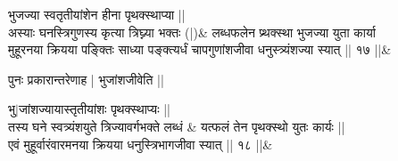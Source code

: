 \documentclass[12pt]{article}
\begin{document}
\vskip15pt

\stanza
{\s भुजज्या स्वतृतीयांशेन हीना पृथक्स्थाप्या ||\\
अस्याः घनस्त्रिगुणस्य कृत्या त्रिघ्न्या भक्तः (|)}&
{\s लब्धफलेन प्र्थक्स्था भुजज्या युता
कार्या \\
मुहूरनया क्रियया पङ्क्तिः साध्या
पङ्क्त्यर्धं चापगुणांशजीवा
धनुस्त्र्यंशज्या स्यात् || १७ ||}\&

\vskip15pt

\pstart
{\s पुनः प्रकारान्तरेणाह | भुजांशजीवेति ||}
\pend

\vskip15pt

\stanza
{\s 
 भु$|$जांशज्यायास्तृतीयांशः पृथक्स्थाप्यः ||\\
तस्य घने स्वत्र्यंशयुते त्रिज्यावर्गभक्ते लब्धं} &
{\s यत्फलं तेन पृथक्स्थो युतः कार्यः ||\\
एवं मुहूर्वारंवारमनया क्रियया धनुस्त्रिभागजीवा स्यात् || १८ ||}\&

\vskip15pt
\end{document}
